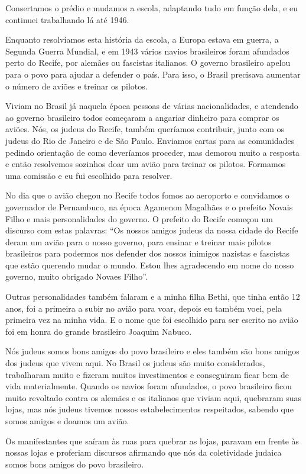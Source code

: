 Consertamos o prédio e mudamos a escola, adaptando tudo em função dela,
e eu continuei trabalhando lá até 1946.

Enquanto resolvíamos esta história da escola, a Europa estava em guerra,
a Segunda Guerra Mundial, e em 1943 vários navios brasileiros foram
afundados perto do Recife, por alemães ou fascistas italianos. O governo
brasileiro apelou para o povo para ajudar a defender o país. Para isso,
o Brasil precisava aumentar o número de aviões e treinar os pilotos.

Viviam no Brasil já naquela época pessoas de várias nacionalidades, e
atendendo ao governo brasileiro todos começaram a angariar dinheiro para
comprar os aviões. Nós, os judeus do Recife, também queríamos
contribuir, junto com os judeus do Rio de Janeiro e de São Paulo.
Enviamos cartas para as comunidades pedindo orientação de como
deveríamos proceder, mas demorou muito a resposta e então resolvemos
sozinhos doar um avião para treinar os pilotos. Formamos uma comissão e
eu fui escolhido para resolver.

No dia que o avião chegou no Recife todos fomos ao aeroporto e
convidamos o governador de Pernambuco, na época Agamenon Magalhães e o
prefeito Novais Filho e mais personalidades do governo. O prefeito do
Recife começou um discurso com estas palavras: ``Os nossos amigos judeus
da nossa cidade do Recife deram um avião para o nosso governo, para
ensinar e treinar mais pilotos brasileiros para podermos nos defender
dos nossos inimigos nazistas e fascistas que estão querendo mudar o
mundo. Estou lhes agradecendo em nome do nosso governo, muito obrigado
Novaes Filho''.

Outras personalidades também falaram e a minha filha Bethi, que tinha
então 12 anos, foi a primeira a subir no avião para voar, depois eu
também voei, pela primeira vez na minha vida. E o nome que foi escolhido
para ser escrito no avião foi em honra do grande brasileiro Joaquim
Nabuco.

Nós judeus somos bons amigos do povo brasileiro e eles também são bons
amigos dos judeus que vivem aqui. No Brasil os judeus são muito
considerados, trabalharam muito e fizeram muitos investimentos e
conseguiram ficar bem de vida materialmente. Quando os navios foram
afundados, o povo brasileiro ficou muito revoltado contra os alemães e
os italianos que viviam aqui, quebraram suas lojas, mas nós judeus
tivemos nossos estabelecimentos respeitados, sabendo que somos amigos e
doamos um avião.

Os manifestantes que saíram às ruas para quebrar as lojas, paravam em
frente às nossas lojas e proferiam discursos afirmando que nós da
coletividade judaica somos bons amigos do povo brasileiro.

